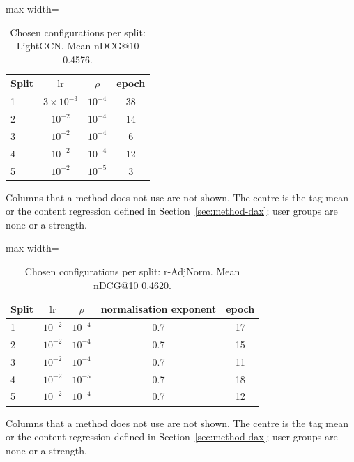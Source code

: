 \documentclass[preprint,12pt,authoryear]{elsarticle}
\begin{document}
\begin{table}[tbp]
\centering
\footnotesize
\caption{Chosen configurations per split: LightGCN. Mean nDCG@10 0.4576.}
\label{tab:grid06}
\begin{adjustbox}{max width=\linewidth}
\begin{tabular}{lccc}
\toprule
Split & $\mathrm{lr}$ & $\rho$ & epoch \\
\midrule
1 & $3\times10^{-3}$ & $10^{-4}$ & 38 \\
2 & $10^{-2}$ & $10^{-4}$ & 14 \\
3 & $10^{-2}$ & $10^{-4}$ & 6 \\
4 & $10^{-2}$ & $10^{-4}$ & 12 \\
5 & $10^{-2}$ & $10^{-5}$ & 3 \\
\bottomrule
\end{tabular}
\end{adjustbox}
\par\smallskip
\begin{minipage}{\linewidth}\raggedright\footnotesize Columns that a method does not use are not shown. The centre is the tag mean or the content regression defined in Section~\ref{sec:method-dax}; user groups are none or a strength.\end{minipage}
\end{table}

\begin{table}[tbp]
\centering
\footnotesize
\caption{Chosen configurations per split: r-AdjNorm. Mean nDCG@10 0.4620.}
\label{tab:grid07}
\begin{adjustbox}{max width=\linewidth}
\begin{tabular}{lcccc}
\toprule
Split & $\mathrm{lr}$ & $\rho$ & normalisation exponent & epoch \\
\midrule
1 & $10^{-2}$ & $10^{-4}$ & 0.7 & 17 \\
2 & $10^{-2}$ & $10^{-4}$ & 0.7 & 15 \\
3 & $10^{-2}$ & $10^{-4}$ & 0.7 & 11 \\
4 & $10^{-2}$ & $10^{-5}$ & 0.7 & 18 \\
5 & $10^{-2}$ & $10^{-4}$ & 0.7 & 12 \\
\bottomrule
\end{tabular}
\end{adjustbox}
\par\smallskip
\begin{minipage}{\linewidth}\raggedright\footnotesize Columns that a method does not use are not shown. The centre is the tag mean or the content regression defined in Section~\ref{sec:method-dax}; user groups are none or a strength.\end{minipage}
\end{table}
\end{document}
